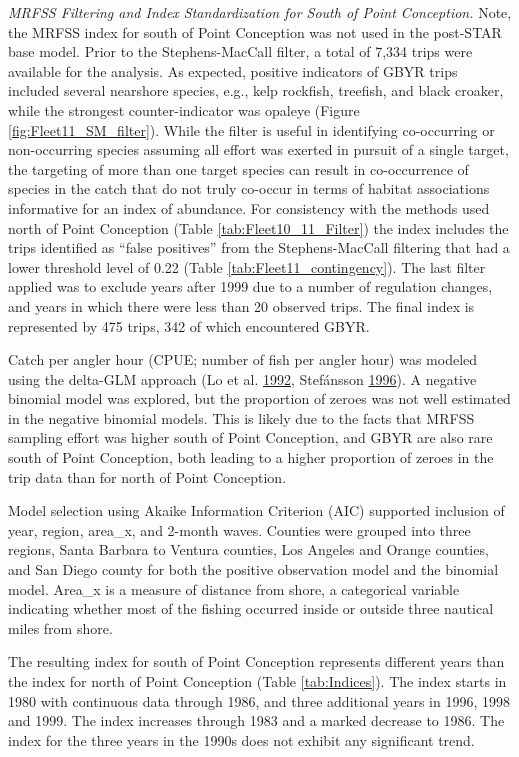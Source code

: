 \documentclass[12pt,]{article}
\begin{document}
\emph{MRFSS Filtering and Index Standardization for South of Point
Conception.} Note, the MRFSS index for south of Point Conception was not
used in the post-STAR base model. Prior to the Stephens-MacCall filter,
a total of 7,334 trips were available for the analysis. As expected,
positive indicators of GBYR trips included several nearshore species,
e.g., kelp rockfish, treefish, and black croaker, while the strongest
counter-indicator was opaleye (Figure \ref{fig:Fleet11_SM_filter}).
While the filter is useful in identifying co-occurring or non-occurring
species assuming all effort was exerted in pursuit of a single target,
the targeting of more than one target species can result in
co-occurrence of species in the catch that do not truly co-occur in
terms of habitat associations informative for an index of abundance. For
consistency with the methods used north of Point Conception (Table
\ref{tab:Fleet10_11_Filter}) the index includes the trips identified as
``false positives'' from the Stephens-MacCall filtering that had a lower
threshold level of 0.22 (Table \ref{tab:Fleet11_contingency}). The last
filter applied was to exclude years after 1999 due to a number of
regulation changes, and years in which there were less than 20 observed
trips. The final index is represented by 475 trips, 342 of which
encountered GBYR.

Catch per angler hour (CPUE; number of fish per angler hour) was modeled
using the delta-GLM approach (Lo et al.
\protect\hyperlink{ref-Lo1992}{1992}, Stefánsson
\protect\hyperlink{ref-Stefansson1996}{1996}). A negative binomial model
was explored, but the proportion of zeroes was not well estimated in the
negative binomial models. This is likely due to the facts that MRFSS
sampling effort was higher south of Point Conception, and GBYR are also
rare south of Point Conception, both leading to a higher proportion of
zeroes in the trip data than for north of Point Conception.

Model selection using Akaike Information Criterion (AIC) supported
inclusion of year, region, area\_x, and 2-month waves. Counties were
grouped into three regions, Santa Barbara to Ventura counties, Los
Angeles and Orange counties, and San Diego county for both the positive
observation model and the binomial model. Area\_x is a measure of
distance from shore, a categorical variable indicating whether most of
the fishing occurred inside or outside three nautical miles from shore.

The resulting index for south of Point Conception represents different
years than the index for north of Point Conception (Table
\ref{tab:Indices}). The index starts in 1980 with continuous data
through 1986, and three additional years in 1996, 1998 and 1999. The
index increases through 1983 and a marked decrease to 1986. The index
for the three years in the 1990s does not exhibit any significant trend.
\end{document}
